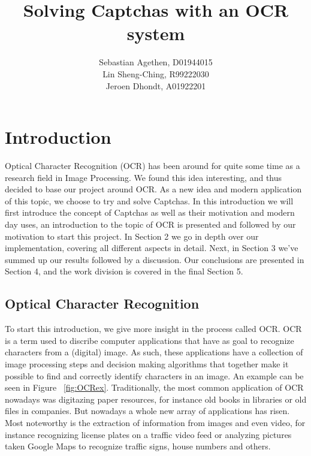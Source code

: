 \documentclass{article}
\begin{document}
\title{Solving Captchas with an OCR system}
\author{Sebastian Agethen, D01944015 \\ Lin Sheng-Ching, R99222030 \\ Jeroen Dhondt, A01922201 }

\onecolumn

\maketitle

\tableofcontents

\twocolumn

\section{Introduction}
\label{sec:intro}

Optical Character Recognition (OCR) has been around for quite some time as a research field in Image Processing. We found this idea interesting, and thus decided to base our project around OCR. As a new idea and modern application of this topic, we choose to try and solve Captchas. In this introduction we will first introduce the concept of Captchas as well as their motivation and modern day uses, an introduction to the topic of OCR is presented and followed by our motivation to start this project. In Section 2 we go in depth over our implementation, covering all different aspects in detail. Next, in Section 3 we've summed up our results followed by a discussion. Our conclusions are presented in Section 4, and the work division is covered in the final Section 5.

\subsection{Optical Character Recognition}
To start this introduction, we give more insight in the process called OCR. OCR is a term used to discribe computer applications that have as goal to recognize characters from a (digital) image. As such, these applications have a collection of image processing steps and decision making algorithms that together make it possible to find and correctly identify characters in an image. An example can be seen in Figure ~\ref{fig:OCRex}. Traditionally, the most common application of OCR nowadays was digitazing paper resources, for instance old books in libraries or old files in companies. But nowadays a whole new array of applications has risen. Most noteworthy is the extraction of information from images and even video, for instance recognizing license plates on a traffic video feed or analyzing pictures taken Google Maps to recognize traffic signs, house numbers and others.
\end{document}
